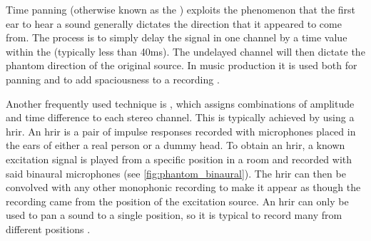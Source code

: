 Time panning (otherwise known as the ) exploits the phenomenon that the first ear to hear a sound generally dictates the direction that it appeared to come from. The process is to simply delay the signal in one channel by a time value within the  (typically less than 40ms). The undelayed channel will then dictate the phantom direction of the original source. In music production it is used both for panning and to add spaciousness to a recording \cite{stewartWhatHaasEffect2022,izhakiPanning2023}. 

Another frequently used technique is , which assigns combinations of amplitude and time difference to each stereo channel. This is typically achieved by using a \gls{hrir}. An \gls{hrir} is a pair of impulse responses recorded with microphones placed in the ears of either a real person or a dummy head. To obtain an \gls{hrir}, a known excitation signal is played from a specific position in a room and recorded with said binaural microphones (see \cref{fig:phantom_binaural}). The \gls{hrir} can then be convolved with any other monophonic recording to make it appear as though the recording came from the position of the excitation source. An \gls{hrir} can only be used to pan a sound to a single position, so it is typical to record many from different positions \cite{armstrongPerceptualEvaluationIndividual2018}.
%  


